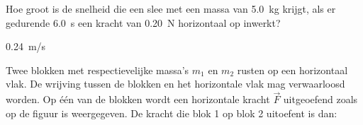 \documentclass{ximera}
\begin{document}
	\author{Bart Lambregs}
    \xmsource\xmuitleg


\begin{exercise}
	Hoe groot is de snelheid die een slee met een massa van \SI{5,0}{kg} krijgt, als er gedurende \SI{6,0}{s} een kracht van \SI{0,20}{N} horizontaal op inwerkt?

	\begin{oplossing}
		\SI{0,24}{m/s}
	\end{oplossing}
\end{exercise}

\begin{exercise}
    Twee blokken met respectievelijke massa's $m_1$ en $m_2$ rusten op een horizontaal vlak. De wrijving tussen de blokken en het horizontale vlak mag verwaarloosd worden. Op \'e\'en van de blokken wordt een horizontale kracht $\vec{F}$ uitgeoefend zoals op de figuur is weergegeven. De kracht die blok 1 op blok 2 uitoefent is dan:

\begin{minipage}[t]{0.4\textwidth}
    \begin{multipleChoice}
    \end{multipleChoice}
\end{minipage}
\hfill
\begin{minipage}[t]{.37\linewidth}
\end{minipage}
\end{exercise}
\end{document}
